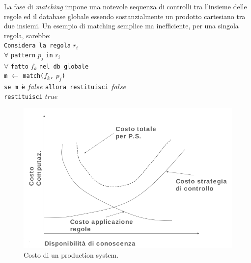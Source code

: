 La fase di \emph{matching} impone una notevole sequenza di controlli tra l'insieme delle regole ed il database globale essendo sostanzialmente un prodotto cartesiano tra due insiemi. Un esempio di matching semplice ma inefficiente, per una singola regola, sarebbe:\\

\indent \verb!Considera la regola! $r_i$\\
\indent \indent $\forall$ \verb!pattern! $p_j$ \verb!in! $r_i$\\
\indent \indent \indent $\forall$ \verb!fatto! $f_k$ \verb!nel db globale!\\
\indent \indent \indent \indent \verb!m! $\leftarrow$ \verb!match(!$f_k$\verb!,! $p_j$\verb!)!\\
\indent \indent \indent \indent \verb!se m è! $false$ \verb!allora restituisci! $false$\\
\indent \verb!restituisci! $true$\\

\begin{figure}
  \centering
  \includegraphics[scale=0.4]{pictures/costprod}
  \caption{Costo di un production system.}
  \label{fig:costo}
\end{figure}


